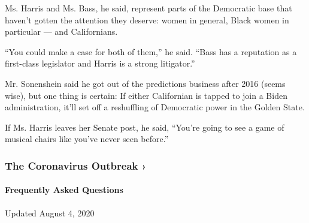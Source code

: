 Ms. Harris and Ms. Bass, he said, represent parts of the Democratic base
that haven't gotten the attention they deserve: women in general, Black
women in particular --- and Californians.

``You could make a case for both of them,'' he said. ``Bass has a
reputation as a first-class legislator and Harris is a strong
litigator.''

Mr. Sonenshein said he got out of the predictions business after 2016
(seems wise), but one thing is certain: If either Californian is tapped
to join a Biden administration, it'll set off a reshuffling of
Democratic power in the Golden State.

If Ms. Harris leaves her Senate post, he said, ``You're going to see a
game of musical chairs like you've never seen before.''

\href{https://www.nytimes3xbfgragh.onion/news-event/coronavirus?action=click\&pgtype=Article\&state=default\&region=MAIN_CONTENT_3\&context=storylines_faq}{}

\hypertarget{the-coronavirus-outbreak-}{%
\subsubsection{The Coronavirus Outbreak
›}\label{the-coronavirus-outbreak-}}

\hypertarget{frequently-asked-questions}{%
\paragraph{Frequently Asked
Questions}\label{frequently-asked-questions}}

Updated August 4, 2020

